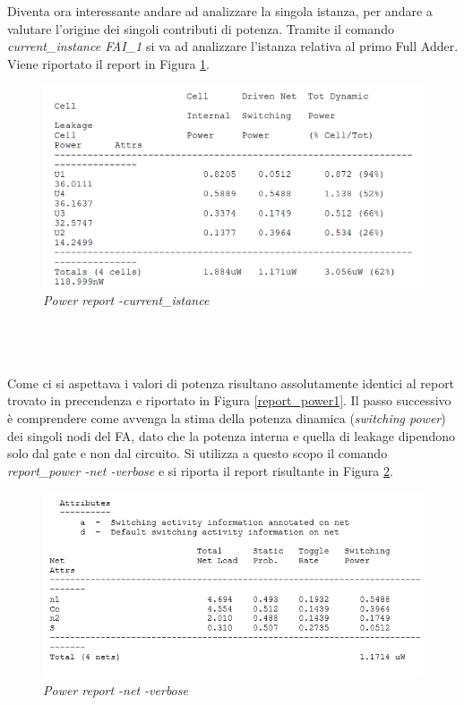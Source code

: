 Diventa ora interessante andare ad analizzare la singola istanza, per andare a valutare l'origine dei singoli contributi di potenza. Tramite il comando \textit{current\_instance FAI\_1} si va ad analizzare l'istanza relativa al primo Full Adder. Viene riportato il report in Figura \ref{reportFA1}.\\
\begin{figure}[!htb]
	\centering
	\includegraphics[scale=0.6]{immagini/reportFA1}
	\caption{\textit{Power report -current\_istance}}
	\label{reportFA1}
\end{figure}
\\
\\
\\
Come ci si aspettava i valori di potenza risultano assolutamente identici al report trovato in precendenza e riportato in Figura \ref{report_power1}.
Il passo successivo è comprendere come avvenga la stima della potenza dinamica (\textit{switching power}) dei singoli nodi del FA, dato che la potenza interna e quella di leakage dipendono solo dal gate e non dal circuito. Si utilizza a questo scopo il comando \textit{report\_power -net -verbose} e si riporta il report risultante in Figura \ref{verbose1}.
\begin{figure}[!htb]
	\centering
	\includegraphics[scale=0.6]{immagini/verbose1}
	\caption{\textit{Power report -net -verbose}}
	\label{verbose1}
\end{figure}
